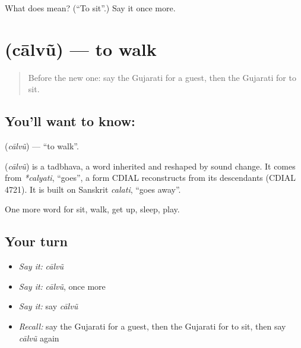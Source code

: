 \begin{tcolorbox}[breakable,colback=teal!4,colframe=teal!35!black,title={Before you move on}]
What does  mean? (\textquotedblleft{}To sit\textquotedblright{}.) Say it once more.
\end{tcolorbox}
\section[\texorpdfstring{\gu{ચાલવું} (cālvũ)}{ચાલવું (cālvũ)}]{ (cālvũ) — to walk}

\label{lesson:GU-C54-chalvu}



\begin{quote}
Before the new one: say the Gujarati for a guest, then the Gujarati for to sit.
\end{quote}

\subsection*{You'll want to know: }
\textbf{} (\emph{cālvũ}) — \textquotedblleft{}to walk\textquotedblright{}.

\begin{cousinweb}
\textbf{} (\emph{cālvũ}) is a tadbhava, a word inherited and reshaped by sound change. It comes from \emph{*calyati}, \textquotedblleft{}goes\textquotedblright{}, a form CDIAL reconstructs from its descendants (CDIAL 4721). It is built on Sanskrit \emph{calati}, \textquotedblleft{}goes away\textquotedblright{}.
\end{cousinweb}

\begin{grammarlens}[title={What you've built}]
One more word for sit, walk, get up, sleep, play.
\end{grammarlens}

\subsection*{Your turn}
\begin{itemize}
\raggedright
  \item \emph{Say it:} \emph{cālvũ}
  \item \emph{Say it:} \emph{cālvũ}, once more
  \item \emph{Say it:} say \emph{cālvũ}
  \item \emph{Recall:} say the Gujarati for a guest, then the Gujarati for to sit, then say \emph{cālvũ} again
\end{itemize}

